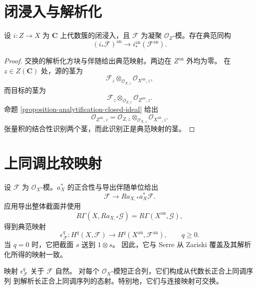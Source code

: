 \section{闭浸入与解析化}
\label{section-analytification-closed-immersions}

\begin{lemma}
\label{lemma-analytification-pushforward-closed-immersion}
\begin{reference}
\cite[\S 3，第 10 号，命题 11]{GAGA}
\end{reference}
设 $i:Z\to X$ 为 $\mathbf C$ 上代数簇的闭浸入，且 $\mathcal F$
为凝聚 $\mathcal O_Z$-模。存在典范同构
$$
(i_*\mathcal F)^{\mathrm{an}}
\longrightarrow i^{\mathrm{an}}_*(\mathcal F^{\mathrm{an}}).
$$
\end{lemma}

\begin{proof}
交换的解析化方块与伴随给出典范映射。两边在 $Z^{\mathrm{an}}$ 外均为零。
在 $z\in Z(\mathbf C)$ 处，源的茎为
$$
\mathcal F_z\otimes_{\mathcal O_{X,z}}
\mathcal O_{X^{\mathrm{an}},z},
$$
而目标的茎为
$$
\mathcal F_z\otimes_{\mathcal O_{Z,z}}
\mathcal O_{Z^{\mathrm{an}},z}.
$$
命题 \ref{proposition-analytification-closed-ideal} 给出
$$
\mathcal O_{Z^{\mathrm{an}},z}
=\mathcal O_{Z,z}\otimes_{\mathcal O_{X,z}}
\mathcal O_{X^{\mathrm{an}},z}.
$$
张量积的结合性识别两个茎，而此识别正是典范映射的茎。
\end{proof}


\section{上同调比较映射}
\label{section-analytification-cohomology-map}

\begin{definition}[上同调比较映射]
\label{construction-analytification-cohomology-map}
\begin{reference}
\cite[\S 3，第 11 号]{GAGA}
\end{reference}
设 $\mathcal F$ 为 $\mathcal O_X$-模。$a_X^*$ 的正合性与导出伴随单位给出
$$
\mathcal F\longrightarrow Ra_{X,*}a_X^*\mathcal F.
$$
应用导出整体截面并使用
$$
R\Gamma(X,Ra_{X,*}\mathcal G)
=R\Gamma(X^{\mathrm{an}},\mathcal G),
$$
得到典范映射
$$
\epsilon^q_{\mathcal F}:
H^q(X,\mathcal F)\longrightarrow
H^q(X^{\mathrm{an}},\mathcal F^{\mathrm{an}}),
\qquad q\geq0.
$$
当 $q=0$ 时，它把截面 $s$ 送到 $1\otimes s$。
因此，它与 Serre 从 Zariski 覆盖及其解析化所得的映射一致。
\end{definition}

\begin{lemma}
\label{lemma-analytification-cohomology-map-functorial}
映射 $\epsilon^q_{\mathcal F}$ 关于 $\mathcal F$ 自然。
对每个 $\mathcal O_X$-模短正合列，它们构成从代数长正合上同调序列
到解析长正合上同调序列的态射。特别地，它们与连接映射可交换。
\end{lemma}

